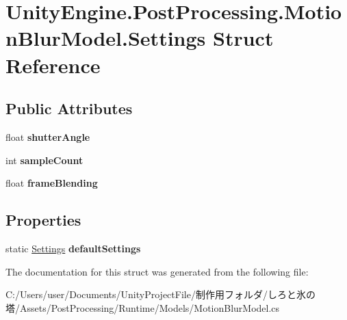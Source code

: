 \hypertarget{struct_unity_engine_1_1_post_processing_1_1_motion_blur_model_1_1_settings}{}\section{Unity\+Engine.\+Post\+Processing.\+Motion\+Blur\+Model.\+Settings Struct Reference}
\label{struct_unity_engine_1_1_post_processing_1_1_motion_blur_model_1_1_settings}
\subsection*{Public Attributes}
\begin{DoxyCompactItemize}
\item 
\mbox{\label{struct_unity_engine_1_1_post_processing_1_1_motion_blur_model_1_1_settings_aa87f06f32cbabf70b57bb5d1222a7289}} 
float {\bfseries shutter\+Angle}
\item 
\mbox{\label{struct_unity_engine_1_1_post_processing_1_1_motion_blur_model_1_1_settings_a5d2163b0f3cdf31d768131d211608523}} 
int {\bfseries sample\+Count}
\item 
\mbox{\label{struct_unity_engine_1_1_post_processing_1_1_motion_blur_model_1_1_settings_a1342d04370729632c1e169d6e909a601}} 
float {\bfseries frame\+Blending}
\end{DoxyCompactItemize}
\subsection*{Properties}
\begin{DoxyCompactItemize}
\item 
\mbox{\label{struct_unity_engine_1_1_post_processing_1_1_motion_blur_model_1_1_settings_a9cab7b33d1ea48a1a47b58d93958dbe0}} 
static \hyperlink{struct_unity_engine_1_1_post_processing_1_1_motion_blur_model_1_1_settings}{Settings} {\bfseries default\+Settings}
\end{DoxyCompactItemize}


The documentation for this struct was generated from the following file\+:\begin{DoxyCompactItemize}
\item 
C\+:/\+Users/user/\+Documents/\+Unity\+Project\+File/制作用フォルダ/しろと氷の塔/\+Assets/\+Post\+Processing/\+Runtime/\+Models/Motion\+Blur\+Model.\+cs\end{DoxyCompactItemize}
